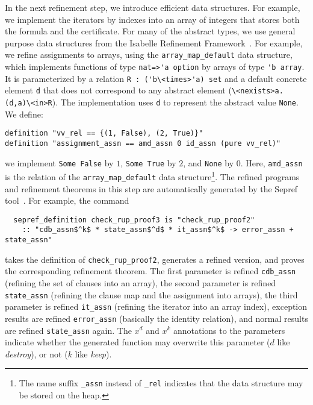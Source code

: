 \documentclass{llncs}
\newcommand{\isai}{\lstinline[language=isabelle,basicstyle=\normalsize\ttfamily\slshape]}
\begin{document}
In the next refinement step, we introduce efficient data structures. For example, we implement the iterators by indexes 
into an array of integers that stores both the formula and the certificate.
For many of the abstract types, we use general purpose data structures from the Isabelle Refinement Framework~\cite{La15,La16}.
For example, we refine assignments to arrays, using the \isai{array_map_default} data structure, which implements functions of type \isai{nat=>'a option} by
arrays of type \isai$'b array$. It is parameterized by a relation \isai$R : ('b\<times>'a) set$ and a default concrete element \isai$d$ that does not correspond to 
any abstract element (\isai$\<nexists>a. (d,a)\<in>R$). The implementation uses \isai$d$ to represent the abstract value \isai$None$.
We define:
\begin{lstlisting}
definition "vv_rel == {(1, False), (2, True)}"
definition "assignment_assn == amd_assn 0 id_assn (pure vv_rel)"
\end{lstlisting}
\ie we implement \isai{Some False} by $1$, \isai{Some True} by $2$, and \isai$None$ by $0$.
Here, \isai$amd_assn$ is the relation of the \isai$array_map_default$ data structure\footnote{The name suffix \isai$_assn$ instead of \isai$_rel$ 
indicates that the data structure may be stored on the heap.}.
The refined programs and refinement theorems in this step are automatically generated by the Sepref tool~\cite{La15}. For example, the command
\begin{lstlisting}
  sepref_definition check_rup_proof3 is "check_rup_proof2"
    :: "cdb_assn$^k$ * state_assn$^d$ * it_assn$^k$ -> error_assn + state_assn"
\end{lstlisting}
takes the definition of \isai{check_rup_proof2}, generates a refined version, and proves the corresponding refinement theorem.
The first parameter is refined \wrt \isai{cdb_assn} (refining the set of clauses into an array), 
the second parameter is refined \wrt \isai{state_assn} (refining the clause map and the assignment into arrays), the third parameter is refined 
\wrt \isai{it_assn} (refining the iterator into an array index), exception results are 
refined \wrt \isai{error_assn} (basically the identity relation), and normal results are refined \wrt \isai{state_assn} again.
The $x^d$ and $x^k$ annotations to the parameters indicate whether the generated function may overwrite this parameter ($d$ like {\em destroy}),
or not ($k$ like {\em keep}). 
\end{document}
